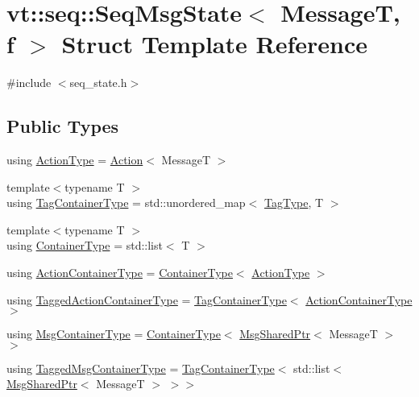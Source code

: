 \hypertarget{structvt_1_1seq_1_1_seq_msg_state}{}\section{vt\+:\+:seq\+:\+:Seq\+Msg\+State$<$ MessageT, f $>$ Struct Template Reference}
\label{structvt_1_1seq_1_1_seq_msg_state}


{\ttfamily \#include $<$seq\+\_\+state.\+h$>$}

\subsection*{Public Types}
\begin{DoxyCompactItemize}
\item 
using \hyperlink{structvt_1_1seq_1_1_seq_msg_state_aaca45f0ba55ada8eb7b66f0fd9cab501}{Action\+Type} = \hyperlink{structvt_1_1seq_1_1_action}{Action}$<$ MessageT $>$
\item 
{\footnotesize template$<$typename T $>$ }\\using \hyperlink{structvt_1_1seq_1_1_seq_msg_state_af44de5aa05c93ee8fa1bc2a84c7107bb}{Tag\+Container\+Type} = std\+::unordered\+\_\+map$<$ \hyperlink{namespacevt_a84ab281dae04a52a4b243d6bf62d0e52}{Tag\+Type}, T $>$
\item 
{\footnotesize template$<$typename T $>$ }\\using \hyperlink{structvt_1_1seq_1_1_seq_msg_state_ad68f7069acda4ef74f973422f368c6e1}{Container\+Type} = std\+::list$<$ T $>$
\item 
using \hyperlink{structvt_1_1seq_1_1_seq_msg_state_a8a998ddbdeee6bd4882f82e0cb1cd6f1}{Action\+Container\+Type} = \hyperlink{structvt_1_1seq_1_1_seq_msg_state_ad68f7069acda4ef74f973422f368c6e1}{Container\+Type}$<$ \hyperlink{structvt_1_1seq_1_1_seq_msg_state_aaca45f0ba55ada8eb7b66f0fd9cab501}{Action\+Type} $>$
\item 
using \hyperlink{structvt_1_1seq_1_1_seq_msg_state_a0f9787d4224b8017484093f967200209}{Tagged\+Action\+Container\+Type} = \hyperlink{structvt_1_1seq_1_1_seq_msg_state_af44de5aa05c93ee8fa1bc2a84c7107bb}{Tag\+Container\+Type}$<$ \hyperlink{structvt_1_1seq_1_1_seq_msg_state_a8a998ddbdeee6bd4882f82e0cb1cd6f1}{Action\+Container\+Type} $>$
\item 
using \hyperlink{structvt_1_1seq_1_1_seq_msg_state_a6821f61ac6a41b210001f49224ed4c9e}{Msg\+Container\+Type} = \hyperlink{structvt_1_1seq_1_1_seq_msg_state_ad68f7069acda4ef74f973422f368c6e1}{Container\+Type}$<$ \hyperlink{namespacevt_ab2b3d506ec8e8d1540aede826d84a239}{Msg\+Shared\+Ptr}$<$ MessageT $>$ $>$
\item 
using \hyperlink{structvt_1_1seq_1_1_seq_msg_state_a57de558c4a7efb36b5358117c6f6d4c5}{Tagged\+Msg\+Container\+Type} = \hyperlink{structvt_1_1seq_1_1_seq_msg_state_af44de5aa05c93ee8fa1bc2a84c7107bb}{Tag\+Container\+Type}$<$ std\+::list$<$ \hyperlink{namespacevt_ab2b3d506ec8e8d1540aede826d84a239}{Msg\+Shared\+Ptr}$<$ MessageT $>$ $>$$>$
\end{DoxyCompactItemize}
